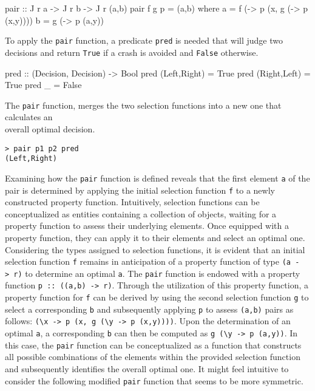 \documentclass[runningheads]{llncs}
\begin{document}
\begin{code}
pair :: J r a -> J r b -> J r (a,b)
pair f g p = (a,b)
  where
      a = f (\x -> p (x, g (\y -> p (x,y))))
      b = g (\y -> p (a,y))
\end{code}

To apply the \texttt{pair} function, a predicate \texttt{pred} is needed
that will judge two decisions and return \texttt{True} if a crash is
avoided and \texttt{False} otherwise.

\begin{code}
pred :: (Decision, Decision) -> Bool
pred (Left,Right) = True
pred (Right,Left) = True
pred _            = False
\end{code}

The \texttt{pair} function, merges the two selection functions into a
new one that calculates an\\
overall optimal decision.

\begin{verbatim}
> pair p1 p2 pred
(Left,Right)
\end{verbatim}

Examining how the \texttt{pair} function is defined reveals that the
first element \texttt{a} of the pair is determined by applying the
initial selection function \texttt{f} to a newly constructed property
function. Intuitively, selection functions can be conceptualized as
entities containing a collection of objects, waiting for a property
function to assess their underlying elements. Once equipped with a
property function, they can apply it to their elements and select an
optimal one. Considering the types assigned to selection functions, it
is evident that an initial selection function \texttt{f} remains in
anticipation of a property function of type
\texttt{(a\ -\textgreater{}\ r)} to determine an optimal \texttt{a}. The
\texttt{pair} function is endowed with a property function
\texttt{p\ ::\ ((a,b)\ -\textgreater{}\ r)}. Through the utilization of
this property function, a property function for \texttt{f} can be
derived by using the second selection function \texttt{g} to select a
corresponding \texttt{b} and subsequently applying \texttt{p} to assess
\texttt{(a,b)} pairs as follows:
\texttt{(\textbackslash{}x\ -\textgreater{}\ p\ (x,\ g\ (\textbackslash{}y\ -\textgreater{}\ p\ (x,y))))}.
Upon the determination of an optimal \texttt{a}, a corresponding
\texttt{b} can then be computed as
\texttt{g\ (\textbackslash{}y\ -\textgreater{}\ p\ (a,y))}. In this
case, the \texttt{pair} function can be conceptualized as a function
that constructs all possible combinations of the elements within the
provided selection function and subsequently identifies the overall
optimal one. It might feel intuitive to consider the following modified
\texttt{pair} function that seems to be more symmetric.
\end{document}
